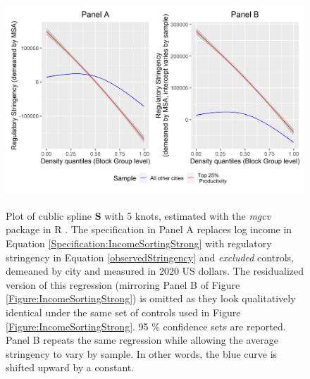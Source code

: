 \documentclass[12pt]{article}
\begin{document}
	\begin{figure}[htbp!]
		\begin{center}
			\includegraphics[width=\textwidth]{incomestringency_combined.png}
			\caption{\\ Plot of cublic spline $\mathbf{S}$ with 5 knots, estimated with the \textit{mgcv} package in R \citep{gampackage}. The specification in Panel A replaces log income in Equation \eqref{Specification:IncomeSortingStrong} with regulatory stringency in Equation \eqref{observedStringency} and \textit{excluded} controls, demeaned by city and measured in 2020 US dollars. The residualized version of this regression (mirroring Panel B of Figure \ref{Figure:IncomeSortingStrong}) is omitted as they look qualitatively identical under the same set of controls used in Figure \ref{Figure:IncomeSortingStrong}. 95 \% confidence sets are reported. Panel B repeats the same regression while allowing the average stringency to vary by sample. In other words, the blue curve is shifted upward by a constant. }\label{Figure:StringencyStrong} 
		\end{center}
	\end{figure}
	
	
	
\end{document}
